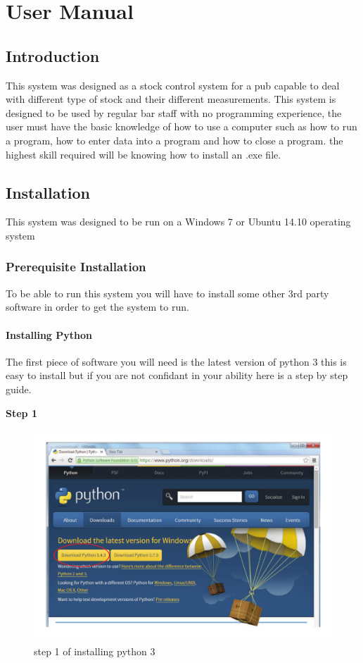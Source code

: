 \chapter{User Manual}

\section{Introduction}
This system was designed as a stock control system for a pub capable to deal with different type of stock and their different measurements. This system is designed to be used by regular bar staff with no programming experience, the user must have the basic knowledge of how to use a computer such as how to run a program, how to enter data into a program and how to close a program. the highest skill required will be knowing how to install an .exe file.

\section{Installation}
This system was designed to be run on a Windows 7 or Ubuntu 14.10 operating system

\subsection{Prerequisite Installation}
To be able to run this system you will have to install some other 3rd party software in order to get the system to run.

\subsubsection{Installing Python}
The first piece of software you will need is the latest version of python 3 this is easy to install but if you are not confidant in your ability here is a step by step guide.

\textbf{Step 1}

\begin{figure}[H]
    \includegraphics[width=\textwidth]{./Manual/images/python1.pdf}
    \caption{step 1 of installing python 3} \label{fig:installing python3 1}
\end{figure}

